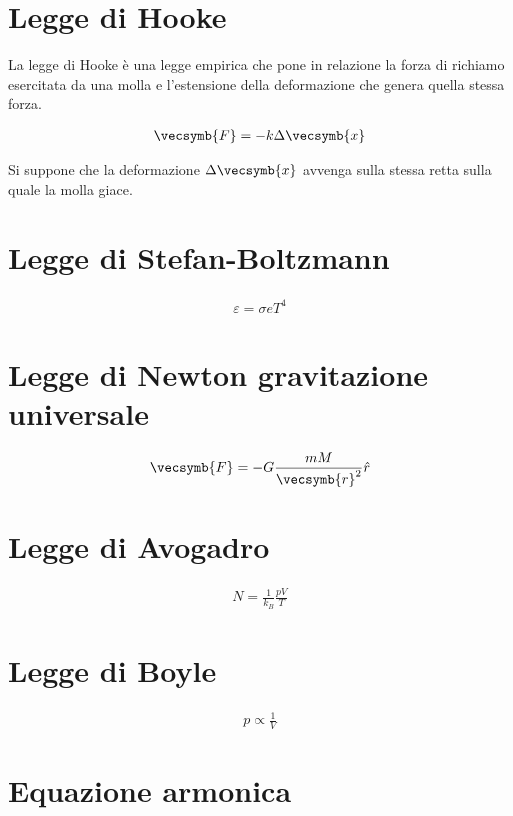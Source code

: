
\section{Legge di Hooke}
La legge di Hooke è una legge empirica che pone in relazione la forza
di richiamo esercitata da una molla e l'estensione della deformazione
che genera quella stessa forza.

\begin{align}
    \vecsymb{F} = -k \Delta\vecsymb{x}\label{hooke}
\end{align}

\noindent Si suppone che la deformazione $\Delta\vecsymb{x}$ avvenga sulla
stessa retta sulla quale la molla giace.


\section{Legge di Stefan-Boltzmann}

\begin{align}
    \varepsilon = \sigma e T^4\label{stefanboltzmann}
\end{align}

\section{Legge di Newton gravitazione universale}


\begin{align}
    \vecsymb{F} = -G \frac{m M}{\vecsymb{r}^2}\hat{r}
\end{align}

\section{Legge di Avogadro}

\begin{align}
    N = \frac{1}{k_B} \frac{pV}{T}
\end{align}

\section{Legge di Boyle}
\begin{align}
    p \propto \frac{1}{V}
\end{align}

\section{Equazione armonica}

